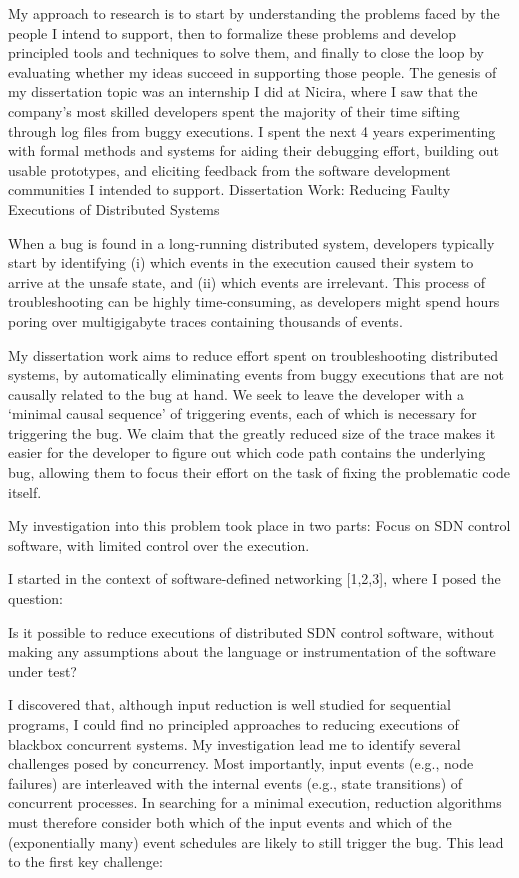 
My approach to research is to start by understanding the problems faced by the people I intend to support, then to formalize these problems and develop principled tools and techniques to solve them, and finally to close the loop by evaluating whether my ideas succeed in supporting those people. The genesis of my dissertation topic was an internship I did at Nicira, where I saw that the company’s most skilled developers spent the majority of their time sifting through log files from buggy executions. I spent the next 4 years experimenting with formal methods and systems for aiding their debugging effort, building out usable prototypes, and eliciting feedback from the software development communities I intended to support.
Dissertation Work: Reducing Faulty Executions of Distributed Systems

When a bug is found in a long-running distributed system, developers typically start by identifying (i) which events in the execution caused their system to arrive at the unsafe state, and (ii) which events are irrelevant. This process of troubleshooting can be highly time-consuming, as developers might spend hours poring over multigigabyte traces containing thousands of events.

My dissertation work aims to reduce effort spent on troubleshooting
distributed systems, by automatically eliminating events from buggy executions
that are not causally related to the bug at hand. We seek to leave the developer with a `minimal causal sequence' of triggering events, each of which is necessary for triggering the bug. We claim that the greatly reduced size of the trace makes it easier for the developer to figure out which code path contains the underlying bug, allowing them to focus their effort on the task of fixing the problematic code itself.

My investigation into this problem took place in two parts:
Focus on SDN control software, with limited control over the execution.

I started in the context of software-defined networking [1,2,3], where I posed the question:

Is it possible to reduce executions of distributed SDN control software, without making any assumptions about the language or instrumentation of the software under test?

I discovered that, although input reduction is well studied for sequential
programs, I could find no principled approaches to reducing executions of
blackbox concurrent systems. My investigation lead me to identify several
challenges posed by concurrency. Most importantly, input events (e.g., node
failures) are interleaved with the internal events (e.g., state transitions)
of concurrent processes. In searching for a minimal execution, reduction algorithms must therefore consider both which of the input events and which of the (exponentially many) event schedules are likely to still trigger the bug. This lead to the first key challenge: 

